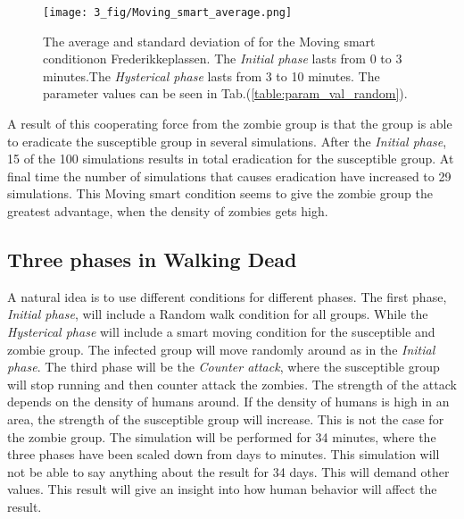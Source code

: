 \documentclass[%
twoside,                 %
final,                   %
chapterprefix=true,      %
open=right               %
10pt]{book}
\begin{document}
\vspace{3mm}




\vspace{3mm}




\begin{figure}[ht]
  \centerline{\texttt{[image: 3\_fig/Moving\_smart\_average.png]}}
  \caption{
  \label{fig:average_moving_smart} The average and standard deviation of for the Moving smart conditionon Frederikkeplassen. The \emph{Initial phase} lasts from 0 to 3 minutes.The \emph{Hysterical phase} lasts from 3 to 10 minutes. The parameter values can be seen in Tab.(\ref{table:param_val_random}).
  }
\end{figure}


A result of this cooperating force from the zombie group is that the group is able to eradicate the susceptible group in several simulations. After the \emph{Initial phase}, 15 of the 100 simulations results in total eradication for the susceptible group. At final time the number of simulations that causes eradication have increased to 29 simulations. This Moving smart condition seems to give the zombie group the greatest advantage, when the density of zombies gets high.

\subsection{Three phases in Walking Dead}
A natural idea is to use different conditions for different phases. The first phase, \emph{Initial phase}, will include a Random walk condition for all groups. While the \emph{Hysterical phase} will include a smart moving condition for the susceptible and zombie group. The infected group will move randomly around as in the \emph{Initial phase}. The third phase will be the \emph{Counter attack}, where the susceptible group will stop running and then counter attack the zombies. The strength of the attack depends on the density of humans around. If the density of humans is high in an area, the strength of the susceptible group will increase. This is not the case for the zombie group. The simulation will be performed for 34 minutes, where the three phases have been scaled down from days to minutes. This simulation will not be able to say anything about the result for 34 days. This will demand other values. This result will give an insight into how human behavior will affect the result.  
\end{document}
